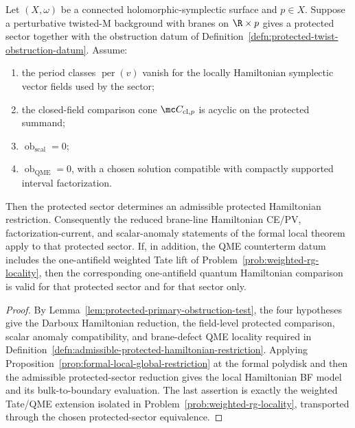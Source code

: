 \begin{thm}\label{thm:protected-twist-hamiltonian-criterion}
  Let \((X,\omega)\) be a connected holomorphic-symplectic surface and
  \(p\in X\).  Suppose a perturbative twisted-M background with branes on
  \(\R\times p\) gives a protected sector together with the
  obstruction datum of
  Definition~\ref{defn:protected-twist-obstruction-datum}.  Assume:
  \begin{enumerate}[label=(\roman*)]
    \item the period classes \(\operatorname{per}(v)\) vanish for the
      locally Hamiltonian symplectic vector fields used by the sector;
    \item the closed-field comparison cone \(\mc C_{\mathrm{cl},p}\) is
      acyclic on the protected summand;
    \item \(\operatorname{ob}_{\mathrm{scal}}=0\);
    \item \(\operatorname{ob}_{\mathrm{QME}}=0\), with a chosen solution
      compatible with compactly supported interval factorization.
  \end{enumerate}
  Then the protected sector determines an admissible protected
  Hamiltonian restriction.  Consequently the reduced brane-line
  Hamiltonian CE/PV, factorization-current, and scalar-anomaly
  statements of the formal local theorem apply to that protected sector.
  If, in addition, the QME counterterm datum includes the one-antifield
  weighted Tate lift of
  Problem~\ref{prob:weighted-rg-locality}, then the corresponding
  one-antifield quantum Hamiltonian comparison is valid for that
  protected sector and for that sector only.
\end{thm}

\begin{proof}
  By Lemma~\ref{lem:protected-primary-obstruction-test}, the four
  hypotheses give the Darboux Hamiltonian reduction, the field-level
  protected comparison, scalar anomaly compatibility, and brane-defect
  QME locality required in
  Definition~\ref{defn:admissible-protected-hamiltonian-restriction}.
  Applying Proposition~\ref{prop:formal-local-global-restriction} at the
  formal polydisk and then the admissible protected-sector reduction gives the
  local Hamiltonian BF model and its bulk-to-boundary evaluation.  The last
  assertion is exactly the weighted Tate/QME extension isolated in
  Problem~\ref{prob:weighted-rg-locality}, transported through the chosen
  protected-sector equivalence.
\end{proof}

